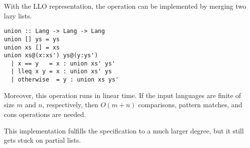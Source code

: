With the LLO representation, the  operation can be
implemented by merging two lazy lists.
\begin{lstlisting}
union :: Lang -> Lang -> Lang
union [] ys = ys
union xs [] = xs
union xs@(x:xs') ys@(y:ys')
  | x == y   = x : union xs' ys'
  | lleq x y = x : union xs' ys
  | otherwise  = y : union xs ys'
\end{lstlisting}
Moreover, this operation runs in linear time. If the input languages
are finite of size $m$ and $n$, respectively, then $O(m+n)$
comparisons, pattern matches, and cons operations are needed.

This implementation fulfills the specification to a much larger
degree, but it still gets stuck on partial lists.

